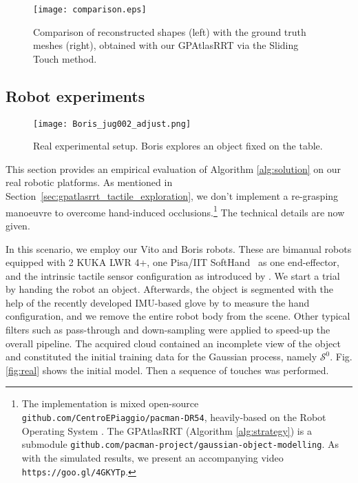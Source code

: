 \begin{figure}[htb]
    \centering
    \texttt{[image: comparison.eps]}
    \caption{Comparison of reconstructed shapes (left) with the ground truth meshes (right), obtained with our GPAtlasRRT via the Sliding Touch method.}
    \label{fig:shapecomp}
\end{figure}


\subsection{Robot experiments}
\label{sec:vito}

\begin{figure}[htb]
    \centering
    \texttt{[image: Boris\_jug002\_adjust.png]}
    \caption{Real experimental setup. Boris explores an object fixed on the table.}
    \label{fig:boris}
\end{figure}

This section provides an empirical evaluation of Algorithm \ref{alg:solution} on our real robotic platforms. As mentioned in Section~\ref{sec:gpatlasrrt_tactile_exploration}, we don't implement a re-grasping manoeuvre to overcome hand-induced occlusions.\footnote{The implementation is mixed open-source \texttt{github.com/CentroEPiaggio/pacman-DR54}, heavily-based on the Robot Operating System \cite{ROS}. The GPAtlasRRT (Algorithm \ref{alg:strategy}) is a submodule \texttt{github.com/pacman-project/gaussian-object-modelling}. As with the simulated results, we present an accompanying video \texttt{https://goo.gl/4GKYTp}.} The technical details are now given.

In this scenario, we employ our Vito and Boris robots. These are bimanual robots equipped with 2 KUKA LWR 4+, one Pisa/IIT SoftHand~\cite{Catalano2014Adaptive} as one end-effector, and the intrinsic tactile sensor configuration as introduced by \cite{Rosales2014Active}. We start a trial by handing the robot an object. Afterwards, the object is segmented with the help of the recently developed IMU-based glove by \cite{Santaera2015Lowcost} to measure the hand configuration, and we remove the entire robot body from the scene. Other typical filters such as pass-through and down-sampling were applied to speed-up the overall pipeline. The acquired cloud contained an incomplete view of the object and constituted the initial training data for the Gaussian process, namely $\mathcal{S}^0$. Fig. \ref{fig:real} shows the initial model. Then a sequence of touches was performed. 

